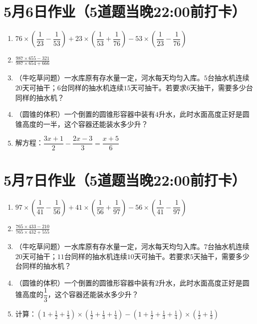 \documentclass[UTF8,12pt,a4paper]{ctexart}
\newcommand{\BottomWriteSpace}{1.8cm}
\newenvironment{OnePageFiveFill}{
  \small
  \vspace*{0pt}
  \begin{enumerate}[leftmargin=*, itemsep=0pt, topsep=0pt, parsep=0pt, partopsep=0pt]
  \setlength{\parskip}{0pt}
}{
  \end{enumerate}
  \vspace*{\BottomWriteSpace}
  \normalsize
  \newpage
}
\newcommand{\Q}[1]{\item #1\par\vfill}
\newcommand{\Qlast}[1]{\item #1\par}
\begin{document}
\section*{5月6日作业（5道题当晚22:00前打卡）}
\begin{OnePageFiveFill}

\Q{$76 \times \left(\dfrac{1}{23} - \dfrac{1}{53}\right) + 23 \times \left(\dfrac{1}{53} + \dfrac{1}{76}\right) - 53 \times \left(\dfrac{1}{23} - \dfrac{1}{76}\right)$}

\Q{$\displaystyle \frac{987 \times 655 - 321}{987 \times 654 + 666}$}

\Q{（牛吃草问题）一水库原有存水量一定，河水每天均匀入库。$5$台抽水机连续$20$天可抽干；$6$台同样的抽水机连续$15$天可抽干。若要求$6$天抽干，需要多少台同样的抽水机？}

\Q{（圆锥的体积）一个倒置的圆锥形容器中装有$4$升水，此时水面高度正好是圆锥高度的一半，这个容器还能装水多少升？}

\Qlast{解方程：$\dfrac{3x+1}{2} - \dfrac{2x-3}{3} = \dfrac{x+5}{6}$}

\end{OnePageFiveFill}

\section*{5月7日作业（5道题当晚22:00前打卡）}
\begin{OnePageFiveFill}

\Q{$97 \times \left(\dfrac{1}{41} - \dfrac{1}{56}\right) + 41 \times \left(\dfrac{1}{56} + \dfrac{1}{97}\right) - 56 \times \left(\dfrac{1}{41} - \dfrac{1}{97}\right)$}

\Q{$\displaystyle \frac{765 \times 433 - 210}{765 \times 432 + 555}$}

\Q{（牛吃草问题）一水库原有存水量一定，河水每天均匀入库。$7$台抽水机连续$20$天可抽干；$11$台同样的抽水机连续$10$天可抽干。若要求$5$天抽干，需要多少台同样的抽水机？}

\Q{（圆锥的体积）一个倒置的圆锥形容器中装有$2$升水，此时水面高度正好是圆锥高度的$\dfrac{1}{3}$，这个容器还能装水多少升？}

\Qlast{计算：$\displaystyle \left(1 + \frac{1}{2} + \frac{1}{3}\right) \times \left(\frac{1}{2} + \frac{1}{3} + \frac{1}{4}\right) - \left(1 + \frac{1}{2} + \frac{1}{3} + \frac{1}{4}\right) \times \left(\frac{1}{2} + \frac{1}{3}\right)$}

\end{OnePageFiveFill}
\end{document}
